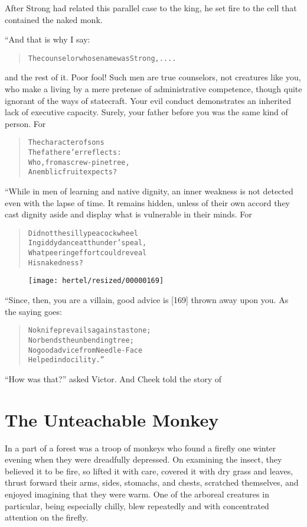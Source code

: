 \documentclass[article, twoside, 10pt]{memoir}
\renewenvironment{verbatim}{%
\begin{quote}%
\vskip -10pt%
\begin{alltt}\normalfont\small}{\end{alltt}%
\end{quote}%
\vskip -10pt
} %
\begin{document}
After Strong had related this parallel case to the king, he set
fire to the cell that contained the naked monk.

“And that is why I say:

\begin{verbatim}
The counselor whose name was Strong, ....
\end{verbatim}
and the rest of it. Poor fool! Such men are true counselors, not
creatures like you, who make a living by a mere pretense of
administrative competence, though quite ignorant of the ways of
statecraft. Your evil conduct demonstrates an inherited lack of
executive capacity. Surely, your father before you was the same
kind of person. For

\begin{verbatim}
The character of sons
    The father e'er reflects:
Who, from a screw-pine tree,
    An emblic fruit expects?
\end{verbatim}
“While in men of learning and native dignity, an inner weakness is
not detected even with the lapse of time. It remains hidden, unless
of their own accord they cast dignity aside and display what is
vulnerable in their minds. For

\begin{verbatim}
Did not the silly peacock wheel
In giddy dance at thunder's peal,
What peering effort could reveal
    His nakedness?
\end{verbatim}
\begin{figure}[p]\texttt{[image: hertel/resized/00000169]}\end{figure}“Since, then, you are a villain, good advice is [169] thrown away
upon you. As the saying goes:

\begin{verbatim}
No knife prevails against a stone;
    Nor bends the unbending tree;
No good advice from Needle-Face
    Helped indocility.”
\end{verbatim}
``How was that?'' asked Victor. And Cheek told the story of

\chapter{The Unteachable Monkey}

In a part of a forest was a troop of monkeys who found a firefly
one winter evening when they were dreadfully depressed. On
examining the insect, they believed it to be fire, so lifted it
with care, covered it with dry grass and leaves, thrust forward
their arms, sides, stomachs, and chests, scratched themselves, and
enjoyed imagining that they were warm. One of the arboreal
creatures in particular, being especially chilly, blew repeatedly
and with concentrated attention on the firefly.
\end{document}
